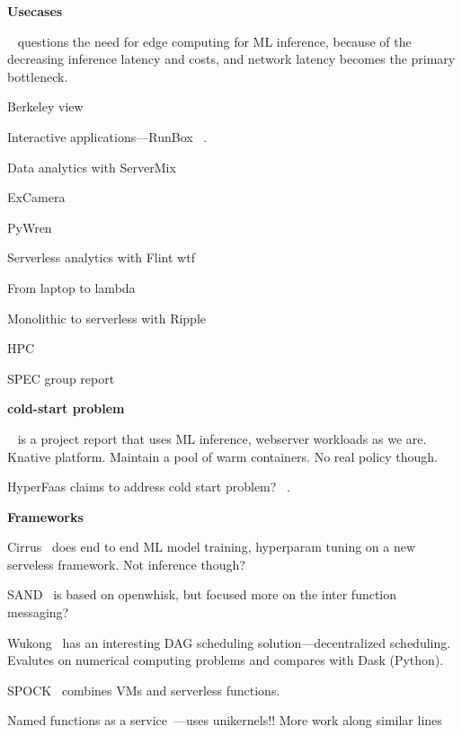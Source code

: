 


\noindent \textbf{Usecases}

~\cite{cartas_reality_2019} questions the need for edge computing for ML inference, because of the decreasing inference latency and costs, and network latency becomes the primary bottleneck.

Berkeley view~\cite{jonas2017occupy, jonas_cloud_2019}

Interactive applications---RunBox ~\cite{glikson_runbox_2019}.

Data analytics with ServerMix~\cite{garcia-lopez_servermix_2019}

ExCamera

PyWren

Serverless analytics with Flint wtf

From laptop to lambda ~\cite{fouladi_laptop_2019}

Monolithic to serverless with Ripple~\cite{joyner_ripple_2020}

HPC~\cite{mocskos_faaster_2018}

SPEC group report~\cite{van_eyk_spec_2017}

\noindent \textbf{cold-start problem}

~\cite{lin_mitigating_2019} is a project report that uses ML inference, webserver workloads as we are. Knative platform. Maintain a pool of warm containers. No real policy though.

HyperFaas claims to address cold start problem? ~\cite{zhang_hyperfaas_2019}. 

\noindent \textbf{Frameworks}

Cirrus~\cite{carreira_cirrus_2019} does end to end ML model training, hyperparam tuning on a new serveless framework. Not inference though?

SAND~\cite{akkus_sand_2018} is based on openwhisk, but focused more on the inter function messaging?

Wukong~\cite{carver_search_2019} has an interesting DAG scheduling solution---decentralized scheduling. Evalutes on numerical computing problems and compares with Dask (Python).

SPOCK~\cite{gunasekaran_spock_2019} combines VMs and serverless functions. 

Named functions as a service~\cite{krol_nfaas_2017}---uses unikernels!!
More work along similar lines~\cite{lin_computation_2019,mtibaa_towards_2018,xylomenos_named_2019,krol_computation_2018}


